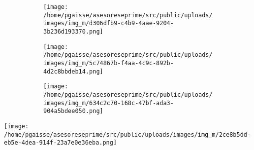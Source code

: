 \documentclass{article}
\begin{document}
                \begin{figure}[H]
                \begin{subfigure}[b]{0.3\textwidth}\centering\texttt{[image: /home/pgaisse/asesoreseprime/src/public/uploads/images/img\_m/d306dfb9-c4b9-4aae-9204-3b236d193370.png]}\end{subfigure}
                \begin{subfigure}[b]{0.3\textwidth}\centering\texttt{[image: /home/pgaisse/asesoreseprime/src/public/uploads/images/img\_m/5c74867b-f4aa-4c9c-892b-4d2c8bbdeb14.png]}\end{subfigure}
                \begin{subfigure}[b]{0.3\textwidth}\centering\texttt{[image: /home/pgaisse/asesoreseprime/src/public/uploads/images/img\_m/634c2c70-168c-47bf-ada3-904a5bdee050.png]}\end{subfigure}
            \end{figure}


\vspace{0.1in}
\vfill

\begin{flushright}

\vspace{-0.1in}\texttt{[image: /home/pgaisse/asesoreseprime/src/public/uploads/images/img\_m/2ce8b5dd-eb5e-4dea-914f-23a7e0e36eba.png]}\vspace{-0.1in}

\end{flushright}
\end{document}
